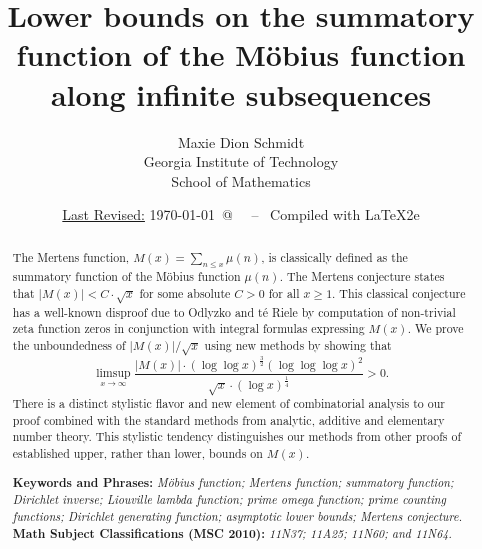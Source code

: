 \documentclass[11pt,reqno,a4letter]{article}
\title{
       \LARGE{
       Lower bounds on the summatory function of the M\"obius function along infinite subsequences 
       } 
}
\author{{\Large Maxie Dion Schmidt} \\ 
        {\normalsize Georgia Institute of Technology} \\[0.025cm] 
        {\normalsize School of Mathematics} 
}
\date{\small\underline{Last Revised:} \today \ @\ \hhmmsstime{} \ -- \ Compiled with \LaTeX2e}
\numberwithin{figure}{section}
\numberwithin{table}{section}
\theoremstyle{plain}
\numberwithin{theorem}{section}
\theoremstyle{definition}
\begin{document}
 

\maketitle

\begin{abstract} 
The Mertens function, $M(x) = \sum_{n \leq x} \mu(n)$, is classically 
defined as the summatory function of the M\"obius function $\mu(n)$. 
The Mertens conjecture states that $|M(x)| < C \cdot \sqrt{x}$ for some absolute $C > 0$ for all 
$x \geq 1$. 
This classical conjecture has a well-known disproof due to 
Odlyzko and t\'{e} Riele by computation of 
non-trivial zeta function zeros in conjunction with integral formulas expressing $M(x)$. 
We prove the unboundedness of $|M(x)| / \sqrt{x}$ using new methods by showing that 
$$\limsup_{x \rightarrow \infty} \frac{|M(x)| \cdot (\log\log x)^{\frac{3}{2}} (\log\log\log x)^{2}}{ 
  \sqrt{x} \cdot (\log x)^{\frac{1}{4}}} > 0.$$ 
There is a distinct stylistic 
flavor and new element of combinatorial analysis to our proof 
combined with the standard methods from analytic, additive and elementary number theory. 
This stylistic tendency distinguishes 
our methods from other proofs of established upper, rather than lower, bounds on $M(x)$. 

\bigskip 
\noindent
\textbf{Keywords and Phrases:} {\it M\"obius function; Mertens function; summatory function; 
                                    Dirichlet inverse; Liouville lambda function; prime omega function; 
                                    prime counting functions; Dirichlet generating function; 
                                    asymptotic lower bounds; Mertens conjecture. } \\ 
\textbf{Math Subject Classifications (MSC 2010):} {\it 11N37; 11A25; 11N60; and 11N64. } 
\end{abstract} 

\end{document}
